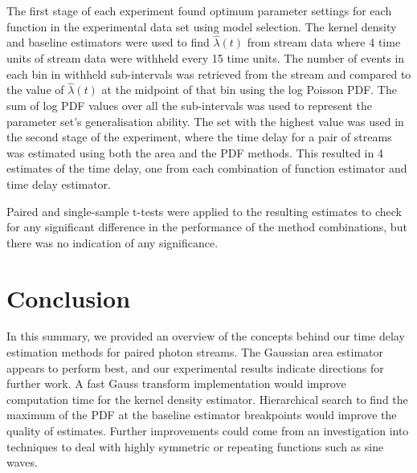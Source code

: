 \documentclass[a4paper,11pt]{article}
\begin{document}
  The first stage of each experiment found optimum parameter settings for each
  function in the experimental data set using model selection. The kernel
  density and baseline estimators were used to find $\hat{\lambda}(t)$ from
  stream data where 4 time units of stream data were withheld every 15 time
  units. The number of events in each bin in withheld sub-intervals was
  retrieved from the stream and compared to the value of $\hat{\lambda}(t)$ at
  the midpoint of that bin using the log Poisson PDF. The sum of log PDF values
  over all the sub-intervals was used to represent the parameter set's
  generalisation ability. The set with the highest value was used in the second
  stage of the experiment, where the time delay for a pair of streams was
  estimated using both the area and the PDF methods. This resulted in 4
  estimates of the time delay, one from each combination of function estimator
  and time delay estimator.

  Paired and single-sample t-tests were applied to the resulting estimates to
  check for any significant difference in the performance of the method
  combinations, but there was no indication of any significance.
\section{Conclusion}
\label{sec-6}

  In this summary, we provided an overview of the concepts behind our time delay
  estimation methods for paired photon streams. The Gaussian area estimator
  appears to perform best, and our experimental results indicate directions for
  further work. A fast Gauss transform implementation would improve computation
  time for the kernel density estimator. Hierarchical search to find the maximum
  of the PDF at the baseline estimator breakpoints would improve the quality of
  estimates. Further improvements could come from an investigation into
  techniques to deal with highly symmetric or repeating functions such as sine
  waves.

\printbibliography
\end{document}
